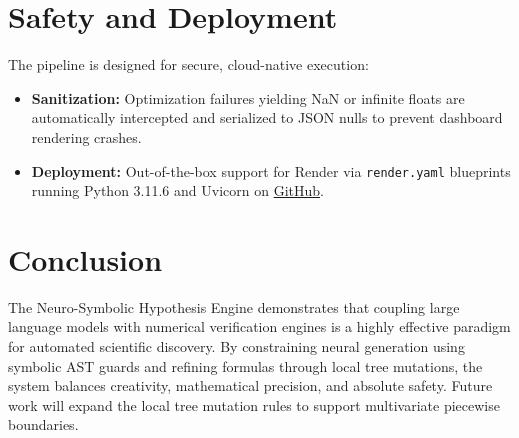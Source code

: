 \documentclass[journal]{IEEEtran}
\begin{document}
\section{Safety and Deployment}
The pipeline is designed for secure, cloud-native execution:
\begin{itemize}
    \item \textbf{Sanitization:} Optimization failures yielding NaN or infinite floats are automatically intercepted and serialized to JSON nulls to prevent dashboard rendering crashes.
    \item \textbf{Deployment:} Out-of-the-box support for Render via \texttt{render.yaml} blueprints running Python 3.11.6 and Uvicorn on \href{https://github.com/Jay846/Neuro-Symbolic-Hypothesis-Engine}{GitHub}.
\end{itemize}

\section{Conclusion}
The Neuro-Symbolic Hypothesis Engine demonstrates that coupling large language models with numerical verification engines is a highly effective paradigm for automated scientific discovery. By constraining neural generation using symbolic AST guards and refining formulas through local tree mutations, the system balances creativity, mathematical precision, and absolute safety. Future work will expand the local tree mutation rules to support multivariate piecewise boundaries.
\end{document}
